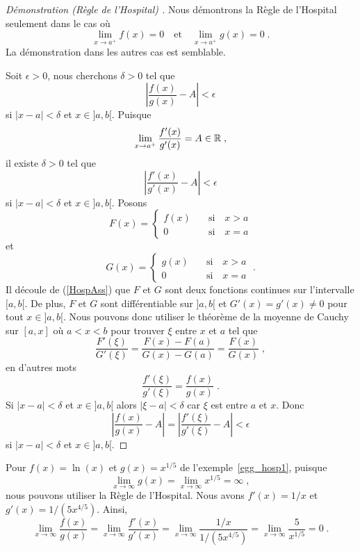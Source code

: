 {\begin{proof}[Démonstration (Règle de l'Hospital) \theory]
Nous démontrons la Règle de l'Hospital seulement dans le cas où
\begin{equation}\label{HospAss}
\lim_{x\rightarrow a^+} f(x) = 0 \quad \text{et} \quad
\lim_{x\rightarrow a^+} g(x) = 0 \; .
\end{equation}
La démonstration dans les autres cas est semblable.

Soit $\epsilon>0$, nous cherchons $\delta >0$ tel que
\[
\left| \frac{f(x)}{g(x)} - A \right| < \epsilon
\]
si $|x-a| < \delta$ et $x\in ]a,b[$.  Puisque
\[
\lim_{x\rightarrow a^+} \frac{f'(x)}{g'(x)} = A \in \mathbb{R} \; ,
\]
il existe $\delta >0$ tel que
\[
\left| \frac{f'(x)}{g'(x)} - A \right| < \epsilon
\]
si $|x-a|< \delta$ et $x\in ]a,b[$.  Posons
\[
F(x) = \begin{cases} f(x) & \quad \text{si} \quad x > a \\
0 & \quad \text{si}\quad  x=a
\end{cases}
\]
et
\[
G(x) = \begin{cases} g(x) & \quad \text{si} \quad x > a \\
0 & \quad \text{si}\quad  x=a
\end{cases} \; .
\]
Il découle de (\ref{HospAss}) que $F$ et $G$ sont deux fonctions
continues sur l'intervalle $[a,b[$.  De plus, $F$ et $G$ sont
différentiable sur $]a,b[$ et $G'(x) = g'(x) \neq 0$ pour tout
$x\in ]a,b[$.  Nous pouvons donc utiliser le théorème de la moyenne de
Cauchy sur $[a,x]$ où $a<x<b$ pour trouver $\xi$ entre $x$ et $a$ tel
que
\[
\frac{F'(\xi)}{G'(\xi)} = \frac{F(x)-F(a)}{G(x)-G(a)} =
\frac{F(x)}{G(x)} \; ,
\]
en d'autres mots
\[
\frac{f'(\xi)}{g'(\xi)} = \frac{f(x)}{g(x)} \; .
\]
Si $|x-a| < \delta$ et $x\in ]a,b[$ alors $|\xi-a| < \delta$ car $\xi$
est entre $a$ et $x$.  Donc
\[
\left| \frac{f(x)}{g(x)} - A \right| =
\left| \frac{f'(\xi)}{g'(\xi)} - A \right| < \epsilon
\]
si $|x-a| < \delta$ et $x \in ]a,b[$.
\end{proof}

\begin{egg}
Pour $f(x) = \ln(x)$ et $g(x)= x^{1/5}$ de l'exemple~\ref{egg_hosp1},
puisque
\[
\lim_{x\rightarrow \infty} g(x) = \lim_{x\rightarrow \infty} x^{1/5}
= \infty \; ,
\]
nous pouvons utiliser la Règle de l'Hospital.  Nous avons $f'(x) = 1/x$ et
$g'(x) = 1/(5x^{4/5})$.  Ainsi,
\[
\lim_{x\rightarrow \infty} \frac{f(x)}{g(x)}
= \lim_{x\rightarrow \infty} \frac{f'(x)}{g'(x)}
= \lim_{x\rightarrow \infty} \frac{1/x}{1/(5x^{4/5})}
=  \lim_{x\rightarrow \infty} \frac{5}{x^{1/5}} = 0 \; .
\]
\end{egg}

}
